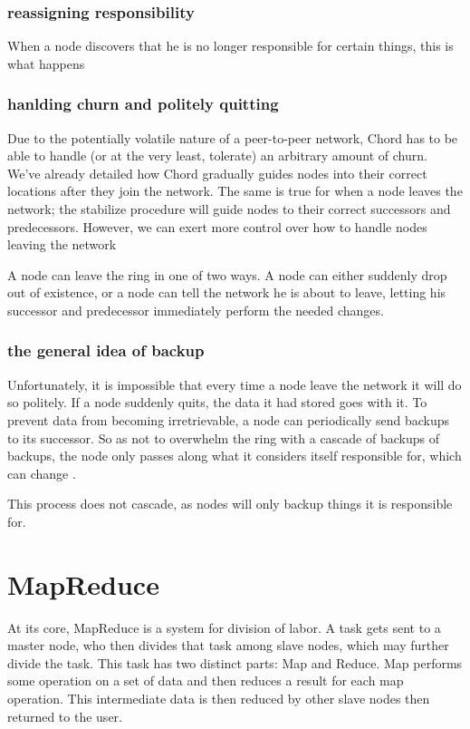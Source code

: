\documentclass[conference, compsocconf, letterpaper]{IEEEtran}
\begin{document}
\subsubsection{reassigning responsibility}
When a node discovers that he is no longer responsible for certain things, this is what happens

\subsubsection{hanlding churn and politely quitting}
Due to the potentially volatile nature of a peer-to-peer network, Chord has to be able to handle (or at the very least, tolerate) an arbitrary amount of churn.  We've already detailed how Chord gradually guides nodes into their correct locations after they join the network.  The same is true for when a node leaves the network; the stabilize procedure will guide nodes to their correct successors and predecessors.  However, we can exert more control over how to handle nodes leaving the network

A node can leave the ring in one of two ways.  A node can either suddenly drop out of existence, or a node can tell the network he is about to leave, letting his successor and predecessor immediately perform the needed changes.  

\subsubsection{the general idea of backup}
Unfortunately, it is impossible that every time a node leave the network it will do so politely.  If a node suddenly quits, the data it had stored goes with it. To prevent data from becoming irretrievable, a node can periodically send backups to its successor.  So as not to overwhelm the ring with a cascade of backups of backups, the node only passes along what it considers itself responsible for, which can change .

This process does not cascade, as nodes will only backup things it is responsible for.


\subsubsection{}
\section{MapReduce}
At its core, MapReduce \cite{mapreduce} is a system for division of labor.  A task gets sent to a master node, who then divides that task among slave nodes, which may further divide the task.  This task has two distinct parts: Map and Reduce.  Map performs some operation on a set of data and then reduces a result for each map operation.  This intermediate data is then reduced by other slave nodes then returned to the user. 
\end{document}
